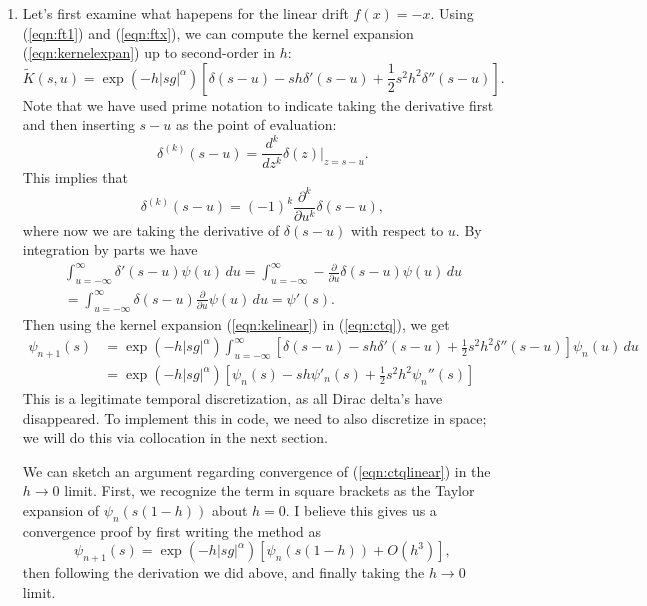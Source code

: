 \documentclass[11pt,letterpaper]{article}
\begin{document}
\begin{enumerate}
\item Let's first examine what hapepens for the linear drift $f(x) = -x$.  Using (\ref{eqn:ft1}) and (\ref{eqn:ftx}), we can compute the kernel expansion  (\ref{eqn:kernelexpan}) up to second-order in $h$:
\begin{equation}
\label{eqn:kelinear}
\widetilde{K}(s,u) = \exp(-h |s g|^{\alpha})  \left[ \delta(s-u) - s h \delta'(s-u) + \frac{1}{2} s^2 h^2 \delta''(s-u) \right].
\end{equation}
Note that we have used prime notation to indicate taking the derivative first and then inserting $s-u$ as the point of evaluation:
\[
\delta^{(k)} (s-u) = \frac{d^k}{d z^k} \delta(z) \biggr|_{z=s-u}.
\]
This implies that
\[
\delta^{(k)} (s-u) = (-1)^k \frac{\partial^k}{\partial u^k} \delta(s-u),
\]
where now we are taking the derivative of $\delta(s-u)$ with respect to $u$.
By integration by parts we have
\begin{multline*}
\int_{u=-\infty}^\infty \delta'(s-u) \psi(u) \, du = 
\int_{u=-\infty}^\infty -\frac{\partial}{\partial u} \delta(s-u) \psi(u) \, du
\\
= \int_{u=-\infty}^\infty \delta(s-u) \frac{\partial}{\partial u} \psi(u) \, du
= \psi'(s).
\end{multline*}
Then using the kernel expansion (\ref{eqn:kelinear}) in (\ref{eqn:ctq}), we get
\begin{align}
\psi_{n+1}(s) &= \exp(-h |s g|^{\alpha})  \int_{u=-\infty}^\infty \left[ \delta(s-u) - s h \delta'(s-u) + \frac{1}{2} s^2 h^2 \delta''(s-u) \right] \psi_n(u) \, du \nonumber \\
\label{eqn:ctqlinear}
 &=  \exp(-h |s g|^{\alpha}) \left[ \psi_n(s) - s h \psi'_n(s) + \frac{1}{2} s^2 h^2 \psi_n''(s) \right]
 \end{align}
This is a legitimate temporal discretization, as all Dirac delta's have disappeared.  To implement this in code, we need to also discretize in space; we will do this via collocation in the next section.

We can sketch an argument regarding convergence of (\ref{eqn:ctqlinear}) in the $h \to 0$ limit.  First, we recognize the term in square brackets as the Taylor expansion of $\psi_n(s(1-h))$ about $h=0$.  I believe this gives us a convergence proof by first writing the method as
\[
\psi_{n+1}(s) = \exp(-h |s g|^{\alpha}) \left[ \psi_n(s(1-h)) + O(h^3) \right],
\]
then following the derivation we did above, and finally taking the $h \to 0$ limit.  


\end{enumerate}
\end{document}
